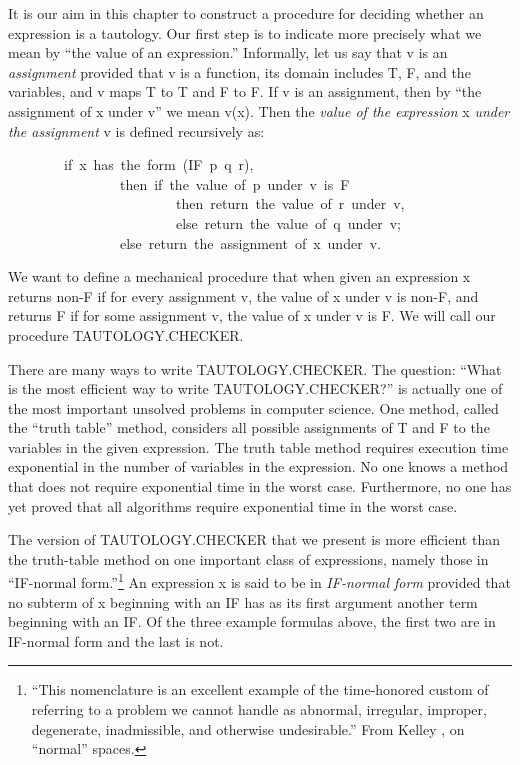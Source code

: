 \documentclass[11pt]{book}
\newenvironment{pubasis}{\begin{flushleft}\ttfamily\small}{\normalsize\rmfamily\end{flushleft}}
\newcommand{\pubinlineunderline}[1]{\emph{#1}}
\begin{document}
It is our aim in this chapter to construct a procedure
for deciding whether an expression is a tautology.
Our first step is to indicate more precisely what we mean by ``the value of
an expression.''  Informally, let us say that v
is  an \pubinlineunderline{assignment} provided that v is a function,
its domain includes T, F, and  the variables,
and v  maps T to T and F to F.
If v is an assignment, then by ``the assignment of x under v'' we
mean v(x).
Then  the \pubinlineunderline{value of the expression} x 
\pubinlineunderline{under the assignment} v is defined recursively as:
\begin{pubasis}
~~~~~~~~if~x~has~the~form~(IF~p~q~r),~\\
~~~~~~~~~~~~~~~~then~if~the~value~of~p~under~v~is~F\\
~~~~~~~~~~~~~~~~~~~~~~~~then~return~the~value~of~r~under~v,\\
~~~~~~~~~~~~~~~~~~~~~~~~else~return~the~value~of~q~under~v;\\
~~~~~~~~~~~~~~~~else~return~the~assignment~of~x~under~v.\\
\end{pubasis}
We want to define  a mechanical procedure that when given an expression x
returns non-F
if  for every assignment v, the value of x under v is non-F, and returns F
if for some assignment v, the value of x under v is F.  We will call
our procedure TAU\-TOL\-OGY.CHECK\-ER.

There are many ways to write   TAU\-TOL\-OGY.CHECK\-ER.  The question:
``What is the most efficient way to write TAU\-TOL\-OGY.CHECK\-ER?'' is actually one
of the most important unsolved problems in computer science.
One  method, called the ``truth table'' method, considers all possible assignments of T and F to the variables
in the given expression.  The truth table
method requires execution time exponential in the number of variables
in the expression.  No one knows a method that
does not require exponential time in the worst case.  Furthermore,
no one has yet proved that all algorithms require exponential time
in the worst case.

The version of TAU\-TOL\-OGY.CHECK\-ER that we present is more
efficient than the truth-table method on one important class of
expressions, namely those in ``IF-normal form.''\footnote{``This nomenclature is an excellent example of the time-honored  custom of referring to a problem we cannot handle as abnormal, irregular, improper, degenerate, inadmissible, and otherwise undesirable.''  From Kelley \cite{KELLEY}, on ``normal'' spaces.}
An expression x is said to be in \pubinlineunderline{IF-normal form} provided
that no subterm of x beginning with an IF has as its first argument
another term beginning with an  IF.
Of the three example formulas above, the first two are in
IF-normal form and the last is not.
\end{document}
